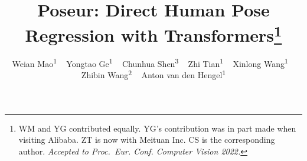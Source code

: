 \documentclass[runningheads]{llncs}
\begin{document}
\pagestyle{headings}
\mainmatter
\def\ECCVSubNumber{4552}  

\title{Poseur: Direct Human Pose Regression with Transformers\thanks{WM and YG contributed equally.
YG's contribution was in part made when visiting Alibaba.
ZT is now with Meituan Inc.
CS is the corresponding author.
\it 
Accepted to Proc.\ Eur. Conf. Computer Vision 2022.
}} 

\author{Weian Mao\textsuperscript{$1$}
        ~ Yongtao Ge\textsuperscript{$1$}
        ~ Chunhua Shen\textsuperscript{$3$} 
        ~ Zhi Tian\textsuperscript{$1$} 
        ~ Xinlong Wang\textsuperscript{$1$} 
        ~ Zhibin Wang\textsuperscript{$2$} 
        ~ Anton van den Hengel\textsuperscript{$1$} }



\begin{comment}
\titlerunning{Abbreviated paper title}
\author{First Author\inst{1}\orcidID{0000-1111-2222-3333} \and
Second Author\inst{2,3}\orcidID{1111-2222-3333-4444} \and
Third Author\inst{3}\orcidID{2222--3333-4444-5555}}
\authorrunning{F. Author et al.}
\institute{Princeton University, Princeton NJ 08544, USA \and
Springer Heidelberg, Tiergartenstr. 17, 69121 Heidelberg, Germany
\email{lncs@springer.com}\\
\url{http://www.springer.com/gp/computer-science/lncs} \and
ABC Institute, Rupert-Karls-University Heidelberg, Heidelberg, Germany\\
\email{\{abc,lncs\}@uni-heidelberg.de}}
\end{comment}
\maketitle
\end{document}
